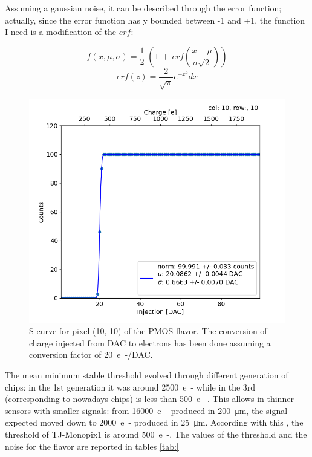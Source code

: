         Assuming a gaussian noise, it can be described through the error function; actually, since the error function has y bounded between -1 and +1, the function I need is a modification of the $erf$: 
        
        \begin{equation}
            f(x, \mu, \sigma) = \frac{1}{2} \; \left(1\,+\,erf\left(\frac{x-\mu}{\sigma \sqrt{2}}\right)\right)
        \end{equation}
        \begin{equation}
            erf(z) = \frac{2}{\sqrt{\pi}} e^{-x^2} dx 
        \end{equation}   
            
    
        \begin{figure}[h!]
            \centering
            \includegraphics[width=.6\linewidth]{figures/charaterization/scurve.png}
            \caption{S curve for pixel (10, 10) of the PMOS flavor. The conversion of charge injected from DAC to electrons has been done assuming a conversion factor of \SI{20}{e-/DAC}.}
            \label{fig:scurve}
        \end{figure}   
        The mean minimum stable threshold evolved through different generation of chips: in the 1st generation it was around \SI{2500}{e-} while in the 3rd (corresponding to nowadays chips) is less than \SI{500}{e-}. This allows in thinner sensors with smaller signals: from \SI{16000}{e-} produced in \SI{200}{\um}, the signal expected moved down to \SI{2000}{e-} produced in \SI{25}{\um}. According with this , the threshold of TJ-Monopix1 is around \SI{500}{e-}.
        The values of the threshold and the noise for the flavor are reported in tables \ref{tab:}
    
